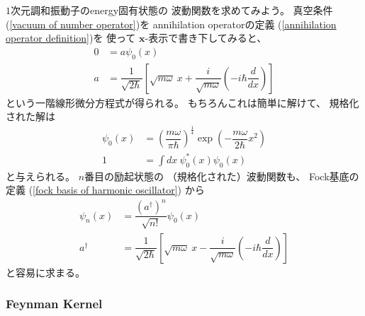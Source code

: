 $1$次元調和振動子のenergy固有状態の
波動関数を求めてみよう。
真空条件(\ref{vacuum of number operator})を
annihilation operatorの定義
(\ref{annihilation operator definition})を
使って
$\bm{x}$-表示で書き下してみると、
\begin{subequations}
\begin{align}
    0
    &=
    a \psi_0(x)
\\
    a
    &=
    \dfrac{1}{\sqrt{2\hbar}}
    \left[
        \sqrt{
            m\omega
        }\ x
        +
        \dfrac{i}{\sqrt{m\omega}}
        \left(
            - i \hbar \dfrac{d}{dx}
        \right)
    \right]
\end{align}
\end{subequations}
という一階線形微分方程式が得られる。
もちろんこれは簡単に解けて、
規格化された解は
\begin{subequations}
\begin{align}
    \psi_0 (x)
    &=
    \left(
        \dfrac{m \omega}{\pi \hbar}        
    \right)^{\frac{1}{4}}
    \exp(- \dfrac{m \omega}{2 \hbar} x^2)
\\
    1
    &=
    \int dx\ 
        \psi_0 ^* (x)
        \psi_0    (x)
\end{align}
\end{subequations}
と与えられる。
$n$番目の励起状態の
（規格化された）波動関数も、
Fock基底の定義
(\ref{fock basis of harmonic oscillator})
から
\begin{subequations}
\begin{align}
    \psi_n (x)
    &=
    \dfrac{ (a^\dagger)^n }{ \sqrt{n!} }
    \psi_0 (x)
\\
    a^\dagger
    &=
    \dfrac{1}{\sqrt{2\hbar}}
    \left[
        \sqrt{
            m\omega
        }\ x
        -
        \dfrac{i}{\sqrt{m\omega}}
        \left(
            - i \hbar \dfrac{d}{dx}
        \right)
    \right]
\end{align}
\end{subequations}
と容易に求まる。

\subsubsection{Feynman Kernel}


